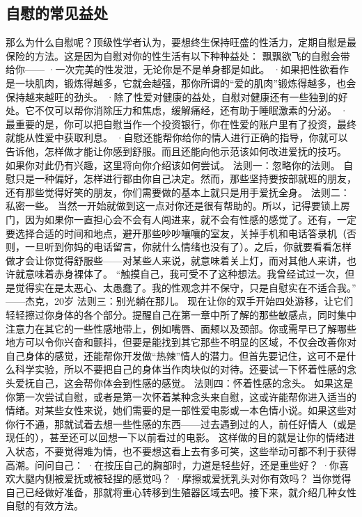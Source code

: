 \documentclass[12pt,UTF8,openany]{ctexbook}
\begin{document}
\subsection*{自慰的常见益处}
那么为什么自慰呢？顶级性学者认为，要想终生保持旺盛的性活力，定期自慰是最保险的方法。这是因为自慰对你的性生活有以下种种益处：
飘飘欲飞的自慰会带给你——
·一次完美的性发泄，无论你是不是单身都是如此。
·如果把性欲看作是一块肌肉，锻炼得越多，它就会越强，那你所谓的“爱的肌肉”锻炼得越多，也会保持越来越旺的劲头。
·除了性爱对健康的益处，自慰对健康还有一些独到的好处。它不仅可以帮你消除压力和焦虑，缓解痛经，还有助于睡眠激素的分泌。
·最重要的是，你可以把自慰当作一个投资银行，你在性爱的账户里有了投资，最终就能从性爱中获取利息。
·自慰还能帮你给你的情人进行正确的指导，你就可以告诉他，怎样做才能让你感到舒服。而且还能向他示范该如何改进爱抚的技巧。
如果你对此仍有兴趣，这里将向你介绍该如何尝试。
法则一：忽略你的法则。
自慰只是一种偏好，怎样进行都由你自己决定。然而，那些坚持要按部就班的朋友，还有那些觉得好笑的朋友，你们需要做的基本上就只是用手爱抚全身。
法则二：私密一些。
当然一开始就做到这一点对你还是很有帮助的。所以，记得要锁上房门，因为如果你一直担心会不会有人闯进来，就不会有性感的感觉了。还有，一定要选择合适的时间和地点，避开那些吵吵嚷嚷的室友，关掉手机和电话答录机（否则，一旦听到你妈的电话留言，你就什么情绪也没有了）。之后，你就要看看怎样做才会让你觉得舒服些——对某些人来说，就意味着关上灯，而对其他人来讲，也许就意味着赤身裸体了。
“触摸自己，我可受不了这种想法。我曾经试过一次，但是觉得实在是太恶心、太愚蠢了。我的性观念并不保守，只是自慰实在不适合我。”
——杰克，20岁
法则三：别光躺在那儿。
现在让你的双手开始四处游移，让它们轻轻擦过你身体的各个部分。提醒自己在第一章中所了解的那些敏感点，同时集中注意力在其它的一些性感地带上，例如嘴唇、面颊以及颈部。你或需早已了解哪些地方可以令你兴奋和颤抖，但要是能找到其它那些不明显的区域，不仅会改善你对自己身体的感觉，还能帮你开发做“热辣”情人的潜力。但首先要记住，这可不是什么科学实验，所以不要把自己的身体当作肉块似的对待。还要试一下怀着性感的念头爱抚自己，这会帮你体会到性感的感觉。
法则四：怀着性感的念头。
如果这是你第一次尝试自慰，或者是第一次怀着某种念头来自慰，这或许能帮你进入适当的情绪。对某些女性来说，她们需要的是一部性爱电影或一本色情小说。如果这些对你行不通，那就试着去想一些性感的东西——过去遇到过的人，前任好情人（或是现任的），甚至还可以回想一下以前看过的电影。
这样做的目的就是让你的情绪进入状态，不要觉得难为情，也不要想这看上去有多可笑，这些举动可都不利于获得高潮。问问自己：
·在按压自己的胸部时，力道是轻些好，还是重些好？
·你喜欢大腿内侧被爱抚或被轻捏的感觉吗？
·摩擦或爱抚乳头对你有效吗？
当你觉得自己已经做好准备，那就将重心转移到生殖器区域去吧。接下来，就介绍几种女性自慰的有效方法。
\end{document}
